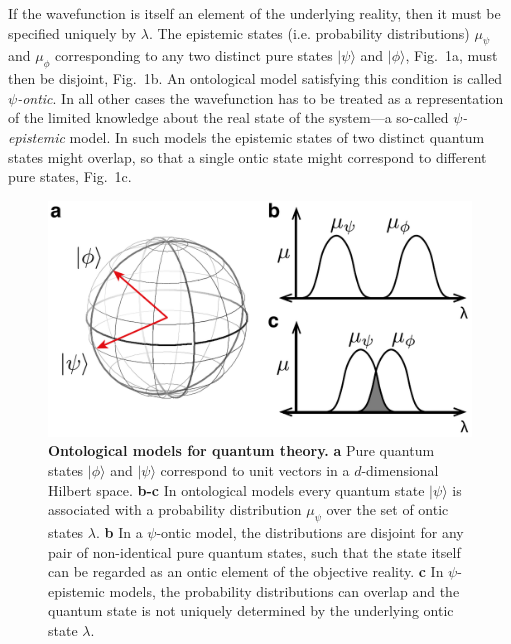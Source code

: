 \documentclass[aps,prl,floatfix,twocolumn,tightenlines,amsmath,amssymb,nofootinbib]{revtex4-1}
\newcommand{\ket}[1] {| #1 \rangle}
\begin{document}
If the wavefunction is itself an element of the underlying reality, then it must be specified uniquely by $\lambda$. The epistemic states (i.e. probability distributions) $\mu_\psi$ and $\mu_\phi$ corresponding to any two distinct pure states $\ket{\psi}$ and $\ket{\phi}$, Fig.~1a, must then be disjoint, Fig.~1b. An ontological model satisfying this condition is called \emph{$\psi$-ontic}.
In all other cases the wavefunction has to be treated as a representation of the limited knowledge about the real state of the system---a so-called \emph{$\psi$-epistemic} model. In such models the epistemic states of two distinct quantum states might overlap, so that a single ontic state might correspond to different pure states, Fig.~1c.

\begin{figure}[h!]
\begin{center}
\includegraphics[width=\columnwidth]{Figure_1.pdf}
\end{center}
\vspace{-1.5em}
\caption{\textbf{Ontological models for quantum theory.} \textbf{a} Pure quantum states $\ket{\phi}$ and $\ket{\psi}$ correspond to unit vectors in a $d$-dimensional Hilbert space.
\textbf{b-c} In ontological models every quantum state $\ket{\psi}$ is associated with a probability distribution $\mu_\psi$ over the set of ontic states $\lambda$. \textbf{b} In a $\psi$-ontic model, the distributions are disjoint for any pair of non-identical pure quantum states, such that the state itself can be regarded as an ontic element of the objective reality. \textbf{c} In $\psi$-epistemic models, the probability distributions can overlap and the quantum state is not uniquely determined by the underlying ontic state $\lambda$.}
  \label{fig:Motivation}
\end{figure}
\end{document}
